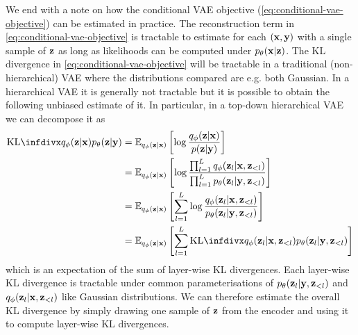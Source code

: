 We end with a note on how the conditional VAE objective (\cref{eq:conditional-vae-objective}) can be estimated in practice. The reconstruction term in \cref{eq:conditional-vae-objective} is tractable to estimate for each $({\mathbf{x}},{\mathbf{y}})$ with a single sample of ${\mathbf{z}}$ as long as likelihoods can be computed under $p_\theta({\mathbf{x}}|{\mathbf{z}})$. The KL divergence in \cref{eq:conditional-vae-objective} will be tractable in  a traditional (non-hierarchical) VAE where the distributions compared are e.g. both Gaussian. In a hierarchical VAE it is generally not tractable but it is possible to obtain the following unbiased estimate of it. In particular, in a top-down hierarchical VAE~\citep{vahdat2020nvae,child2020very} we can decompose it as
\begin{align}
    \kl{q_\phi(\rvz|\rvx)}{p_\theta(\rvz|\rvy)} &= \EX_{q_\phi(\rvz|\rvx)} \left[  \log \frac{q_\phi(\rvz|\rvx)}{p(\rvz|\rvy)} \right] \\
    &= \EX_{q_\phi(\rvz|\rvx)} \left[ \log \frac{\prod_{l=1}^L q_\phi(\rvz_l|\rvx,\rvz_{<l})}{\prod_{l=1}^L p_\theta(\rvz_l|\rvy,\rvz_{<l})} \right] \\
    &= \EX_{q_\phi(\rvz|\rvx)} \left[ \sum_{l=1}^L \log \frac{q_\phi(\rvz_l|\rvx,\rvz_{<l})}{p_\theta(\rvz_l|\rvy,\rvz_{<l})} \right] \\
    &= \EX_{q_\phi(\rvz|\rvx)} \left[ \sum_{l=1}^L \kl{q_\phi(\rvz_l|\rvx,\rvz_{<l})}{p_\theta(\rvz_l|\rvy,\rvz_{<l})} \right]
\end{align}
which is an expectation of the sum of layer-wise KL divergences. Each layer-wise KL divergence is tractable under common parameterisations of $p_\theta({\mathbf{z}}_l|{\mathbf{y}},{\mathbf{z}}_{<l})$ and $q_\phi({\mathbf{z}}_l|{\mathbf{x}},{\mathbf{z}}_{<l})$ like Gaussian distributions. We can therefore estimate the overall KL divergence by simply drawing one sample of ${\mathbf{z}}$ from the encoder and using it to compute layer-wise KL divergences.


